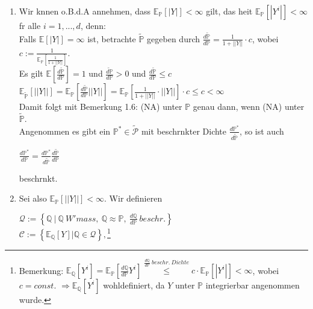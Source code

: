 \documentclass[envcountsame,envcountchap,envcountsect,amsart]{svmono}
\begin{document}
\begin{enumerate}
\item Wir knnen o.B.d.A annehmen, dass $\mathbb{E}_{\mathbb{P}}\left[|Y|\right]<\infty$ gilt, das heit $\mathbb{E}_{\mathbb{P}}\left[|Y^i|\right]<\infty$ fr alle $i=1,...,d$, denn:\vspace*{.1cm}\\
Falls $\mathbb{E}\left[|Y|\right]=\infty$ ist, betrachte $\widetilde{\mathbb{P}}$ gegeben durch $\frac{d\widetilde{\mathbb{P}}}{d\mathbb{P}}=\frac{1}{1+||Y||}\cdot c$, wobei $c:=\frac{1}{\mathbb{E}_{\mathbb{P}}\left[\frac{1}{1+||Y||}\right]}$.\vspace*{.1cm}\\
Es gilt $\mathbb{E}\left[\frac{d\widetilde{\mathbb{P}}}{d\mathbb{P}}\right]=1$ und $\frac{\widetilde{d\mathbb{P}}}{d\mathbb{P}}>0$ und $\frac{d\widetilde{\mathbb{P}}}{d\mathbb{P}}\leq c$\vspace*{.1cm}\\
$\mathbb{E}_{\widetilde{\mathbb{P}}}\left[||Y||\right]=\mathbb{E}_{\mathbb{P}}\left[\frac{d\widetilde{\mathbb{P}}}{d\mathbb{P}}||Y||\right]=\mathbb{E}_{\mathbb{P}}\left[\frac{1}{1+||Y||}\cdot ||Y||\right]\cdot c\leq c<\infty$\vspace*{.1cm}\\
Damit folgt mit Bemerkung 1.6: (NA) unter $\mathbb{P}$ genau dann, wenn (NA) unter $\widetilde{\mathbb{P}}$.\vspace*{.1cm}\\
Angenommen es gibt ein $\mathbb{P}^*\in \widetilde{\mathcal{P}}$ mit beschrnkter Dichte $\frac{d\mathbb{P}^*}{d\widetilde{\mathbb{P}}}$, so ist auch
\begin{center}
$\frac{d\mathbb{P}^*}{d\mathbb{P}}=\frac{d\mathbb{P}^*}{d\widetilde{\mathbb{P}}}\frac{d\widetilde{\mathbb{P}}}{d\mathbb{P}}$
\end{center}
beschrnkt.\vspace*{.1cm}\\
\item Sei also $\mathbb{E}_ {\mathbb{P}}\left[||Y||\right]<\infty$. Wir definieren
\begin{center}
$\mathcal{Q}:=\left\{\mathbb{Q}\ |\ \mathbb{Q}\ W'mass,\ \mathbb{Q}\approx\mathbb{P},\ \frac{d\mathbb{Q}}{d\mathbb{P}}\ beschr.\right\}$\vspace*{.1cm}\\
$\mathcal{C}:=\left\{\mathbb{E}_{\mathbb{Q}}\left[Y\right]|\mathbb{Q}\in\mathcal{Q}\right\},$\footnote{Bemerkung: $\mathbb{E}_{\mathbb{Q}}\left[Y^i\right]=\mathbb{E}_{\mathbb{P}}\left[\frac{d\mathbb{Q}}{d\mathbb{P}}Y^i\right]\stackrel{\frac{d\mathbb{Q}}{d\mathbb{P}}\ beschr.\ Dichte}{\leq} c\cdot\mathbb{E}_{\mathbb{P}}\left[|Y^i|\right]<\infty$, wobei $c=const.$ $\Longrightarrow \mathbb{E}_{\mathbb{Q}}\left[Y^i\right]$ wohldefiniert, da $Y$ unter $\mathbb{P}$ integrierbar angenommen wurde.}

\end{center}
\end{enumerate}
\end{document}
